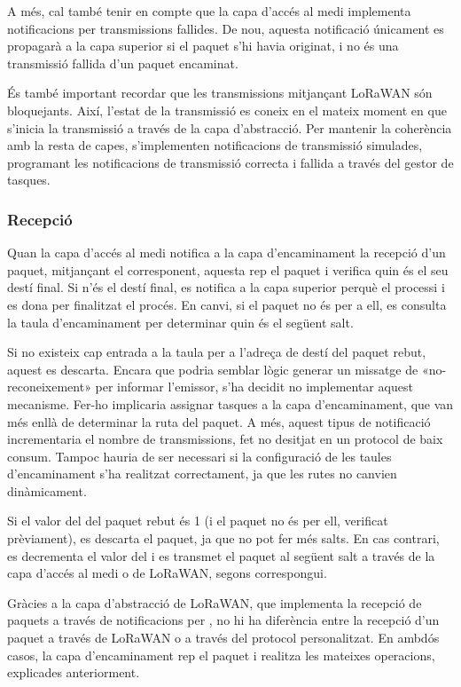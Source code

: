\documentclass{tfgitic}[2024/07/01]
\begin{document}
{A més, cal també tenir en compte que la capa d'accés al medi implementa notificacions per transmissions fallides. De nou, aquesta notificació únicament es propagarà a la capa superior si el paquet s'hi havia originat, i no és una transmissió fallida d'un paquet encaminat. 

És també important recordar que les transmissions mitjançant LoRaWAN són bloquejants. Així, l'estat de la transmissió es coneix en el mateix moment en que s'inicia la transmissió a través de la capa d'abstracció. Per mantenir la coherència amb la resta de capes, s'implementen notificacions de transmissió simulades, programant les notificacions de transmissió correcta i fallida a través del gestor de tasques.
\subsubsection{Recepció}
\label{subsubsec:routing_rx}
Quan la capa d’accés al medi notifica a la capa d’encaminament la recepció d’un paquet, mitjançant el  corresponent, aquesta rep el paquet i verifica quin és el seu destí final. Si n'és el destí final, es notifica a la capa superior perquè el processi i es dona per finalitzat el procés. En canvi, si el paquet no és per a ell, es consulta la taula d’encaminament per determinar quin és el següent salt.

Si no existeix cap entrada a la taula per a l’adreça de destí del paquet rebut, aquest es descarta. Encara que podria semblar lògic generar un missatge de «no-reconeixement» per informar l’emissor, s’ha decidit no implementar aquest mecanisme. Fer-ho implicaria assignar tasques a la capa d’encaminament, que van més enllà de determinar la ruta del paquet. A més, aquest tipus de notificació incrementaria el nombre de transmissions, fet no desitjat en un protocol de baix consum. Tampoc hauria de ser necessari si la configuració de les taules d’encaminament s'ha realitzat correctament, ja que les rutes no canvien dinàmicament.

Si el valor del  del paquet rebut és 1 (i el paquet no és per ell, verificat prèviament), es descarta el paquet, ja que no pot fer més salts. En cas contrari, es decrementa el valor del  i es transmet el paquet al següent salt a través de la capa d'accés al medi o de LoRaWAN, segons correspongui.

Gràcies a la capa d'abstracció de LoRaWAN, que implementa la recepció de paquets a través de notificacions per , no hi ha diferència entre la recepció d'un paquet a través de LoRaWAN o a través del protocol personalitzat. En ambdós casos, la capa d'encaminament rep el paquet i realitza les mateixes operacions, explicades anteriorment.

}
\end{document}
